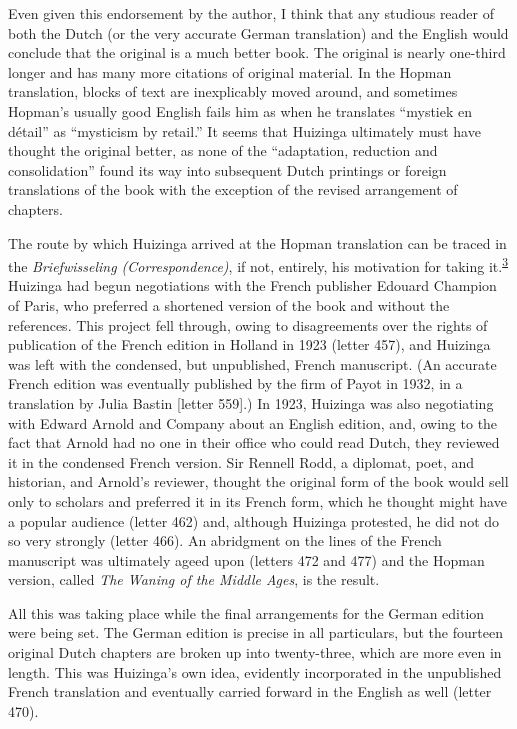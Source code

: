 Even given this endorsement by the author, I think that any studious
reader of both the Dutch (or the very accurate German translation) and
the English would conclude that the original is a much better book. The
original is nearly one-third longer and has many more citations of
original material. In the Hopman translation, blocks of text are
inexplicably moved around, and sometimes Hopman's usually good English
fails him as when he translates ``mystiek en détail'' as ``mysticism by
retail.'' It seems that Huizinga ultimately must have thought the
original better, as none of the ``adaptation, reduction and
consolidation'' found its way into subsequent Dutch printings or foreign
translations of the book with the exception of the revised arrangement
of chapters.

The route by which Huizinga arrived at the Hopman translation can be
traced in the \emph{Briefwisseling (Correspondence)}, if not, entirely,
his motivation for taking
it.\textsuperscript{\protect\hypertarget{05_TRANSLATOR_S_INTRODUCTION.xhtmlux5cux23id_2243}{\protect\hyperlink{23_NOTES.xhtmlux5cux23id_2244}{3}}}
Huizinga had begun negotiations with the French publisher Edouard
Champion of Paris, who preferred a shortened version of the book and
without the references. This project fell through, owing to
disagreements over the rights of publication of the French edition in
Holland in 1923 (letter 457), and Huizinga was left with the condensed,
but unpublished, French manuscript. (An accurate French edition was
eventually published by the firm of Payot in 1932, in a translation by
Julia Bastin {[}letter 559{]}.) In 1923, Huizinga was also negotiating
with Edward Arnold and Company about an English edition, and, owing to
the fact that Arnold had no one in their office who could read Dutch,
they reviewed it in the condensed French version. Sir Rennell Rodd, a
diplomat, poet, and historian, and Arnold's reviewer, thought the
original form of the book would sell only to scholars and preferred it
in its French form, which he thought might have a popular audience
(letter 462) and, although Huizinga protested, he did not do so very
strongly (letter 466). An abridgment on the lines of the French
manuscript was ultimately ageed upon (letters 472 and 477) and the
Hopman version, called \emph{The Waning of the Middle Ages}, is the
result.

\protect\hypertarget{05_TRANSLATOR_S_INTRODUCTION.xhtmlux5cux23page_xi}{}{}All
this was taking place while the final arrangements for the German
edition were being set. The German edition is precise in all
particulars, but the fourteen original Dutch chapters are broken up into
twenty-three, which are more even in length. This was Huizinga's own
idea, evidently incorporated in the unpublished French translation and
eventually carried forward in the English as well (letter 470).

